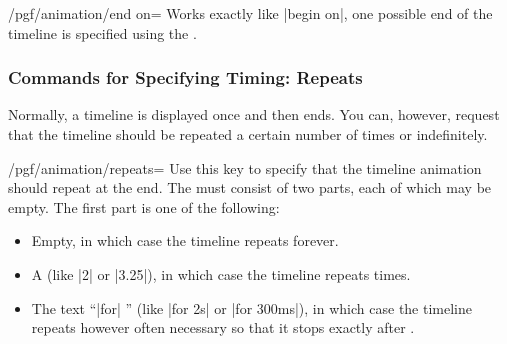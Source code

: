 \begin{key}{/pgf/animation/end on=}
  Works exactly like |begin on|, one possible end of the timeline is
  specified using the .
\end{key}


\subsubsection{Commands for Specifying Timing: Repeats}

Normally, a timeline is displayed once and then ends. You can,
however, request that the timeline should be repeated a certain number
of times or indefinitely. 

\begin{key}{/pgf/animation/repeats=}
  Use this key to specify that the timeline animation should repeat at
  the end. The  must consist of two parts, each of
  which may be empty. The first part is one of the following:
  \begin{itemize}
  \item Empty, in which case the timeline repeats forever.
\begin{codeexample}[width=2cm]
\end{codeexample}
  \item A  (like |2| or |3.25|), in which case the
    timeline repeats  times.
\begin{codeexample}[width=2cm]
\end{codeexample}
  \item The text ``|for| '' (like |for 2s| or |for 300ms|),
    in which case the timeline repeats however often necessary so that
    it  stops exactly after .
\begin{codeexample}[width=2cm]
\end{codeexample}
  \end{itemize}

\end{key}

